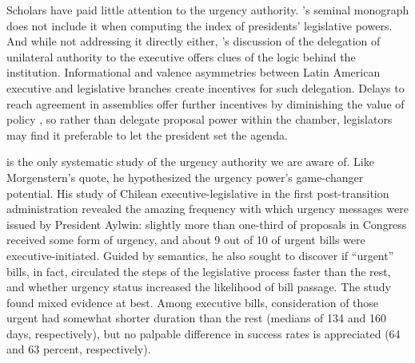 \documentclass[letter,12pt]{article}
\begin{document}

\noindent Scholars have paid little attention to the urgency authority. \citeauthor{shugart.carey.1992}'s \citeyearpar{shugart.carey.1992} seminal monograph does not include it when computing the index of presidents' legislative powers. And while not addressing it directly either, \citeauthor{carey.shugart.1998a}'s \citeyearpar{carey.shugart.1998a} discussion of the delegation of unilateral authority to the executive offers clues of the logic behind the institution. Informational and valence asymmetries between Latin American executive and legislative branches create incentives for such delegation. Delays to reach agreement in assemblies offer further incentives by diminishing the value of policy \citep{baron.ferejohn.1989}, so rather than delegate proposal power within the chamber, legislators may find it preferable to let the president set the agenda. 


\citet{siavelis.2002} is the only systematic study of the urgency authority we are aware of. Like Morgenstern's quote, he hypothesized the urgency power's game-changer potential. His study of Chilean executive-legislative in the first post-transition administration revealed the amazing frequency with which urgency messages were issued by President Aylwin: slightly more than one-third of proposals in Congress received some form of urgency, and about 9 out of 10 of urgent bills were executive-initiated. Guided by semantics, he also sought to discover if ``urgent'' bills, in fact, circulated the steps of the legislative process faster than the rest, and whether urgency status increased the likelihood of bill passage. The study found mixed evidence at best. Among executive bills, consideration of those urgent had somewhat shorter duration than the rest (medians of 134 and 160 days, respectively), but no palpable difference in success rates is appreciated (64 and 63 percent, respectively). 
\end{document}
